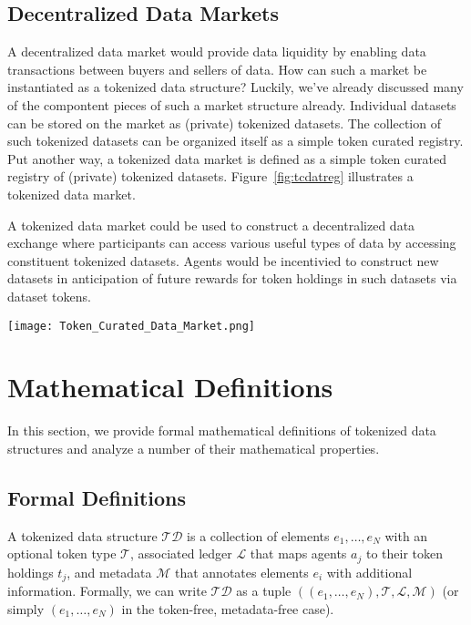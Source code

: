 \documentclass{llncs}
\begin{document}
\subsection{Decentralized Data Markets}

A decentralized data market would provide data liquidity by enabling data transactions between buyers and sellers of data. How can such a market be instantiated as a tokenized data structure? Luckily, we've already discussed many of the compontent pieces of such a market structure already. Individual datasets can be stored on the market as (private) tokenized datasets. The collection of such tokenized datasets can be organized itself as a simple token curated registry. Put another way, a tokenized data market is defined as a simple token curated registry of (private) tokenized datasets. Figure~\ref{fig:tcdatreg} illustrates a tokenized data market.

A tokenized data market could be used to construct a decentralized data exchange where participants can access various useful types of data by accessing constituent tokenized datasets. Agents would be incentivied to construct new datasets in anticipation of future rewards for token holdings in such datasets via dataset tokens.

\begin{figure*}
  \centering
  \texttt{[image: Token\_Curated\_Data\_Market.png]}
  \caption{A tokenized data market. Different datasets are incentivized by different tokens.}
  \label{fig:tcdatreg}
\end{figure*}




\section{Mathematical Definitions}

In this section, we provide formal mathematical definitions of tokenized data structures and analyze a number of their mathematical properties. 

\subsection{Formal Definitions}
A tokenized data structure $\mathcal{TD}$ is a collection of elements $e_1,\dotsc, e_N$ with an optional token type $\mathcal{T}$, associated ledger $\mathcal{L}$ that maps agents $a_j$ to their token holdings $t_j$, and metadata $\mathcal{M}$ that annotates elements $e_i$ with additional information. Formally, we can write $\mathcal{TD}$ as a tuple $((e_1,\dotsc,e_N), \mathcal{T}, \mathcal{L}, \mathcal{M})$ (or simply $(e_1,\dotsc, e_N)$ in the token-free, metadata-free case).
\end{document}
